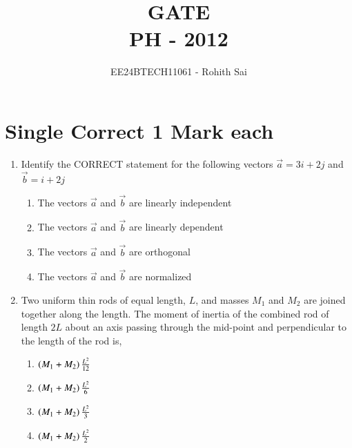 \documentclass[journal]{IEEEtran}
\begin{document}

\vspace{3cm}

\title{GATE\\PH - 2012}
\author{EE24BTECH11061 - Rohith Sai}
\maketitle

\renewcommand{\thefigure}{\theenumi}
\renewcommand{\thetable}{\theenumi}

\section*{Single Correct 1 Mark each}
\begin{enumerate}
\item Identify the CORRECT statement for the following vectors $\vec{a} = 3i+ 2j$ and $\vec{b} = i + 2j$
\begin{multicols}{2}
    \begin{enumerate}
        \item The vectors $\vec{a}$ and $\vec{b}$ are linearly independent
        \item The vectors $\vec{a}$ and $\vec{b}$ are linearly dependent
        \item The vectors $\vec{a}$ and $\vec{b}$ are orthogonal
        \item The vectors $\vec{a}$ and $\vec{b}$ are normalized
    \end{enumerate}
\end{multicols}

\item Two uniform thin rods of equal length, $L$, and masses $M_1$ and $M_2$ are joined together along the
length. The moment of inertia of the combined rod of length $2L$ about an axis passing through the
mid-point and perpendicular to the length of the rod is,
\begin{multicols}{2}
    \begin{enumerate}
        \item $\left(M_1 + M_2\right)\frac{L^2}{12}$
        \item $\left(M_1 + M_2\right)\frac{L^2}{6}$
        \item $\left(M_1 + M_2\right)\frac{L^2}{3}$
        \item $\left(M_1 + M_2\right)\frac{L^2}{2}$
    \end{enumerate}
\end{multicols}
    

\end{enumerate}
\end{document}
